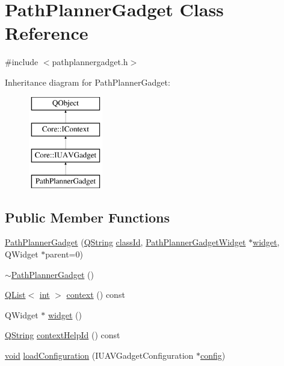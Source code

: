 \hypertarget{class_path_planner_gadget}{\section{Path\-Planner\-Gadget Class Reference}
\label{class_path_planner_gadget}
}


{\ttfamily \#include $<$pathplannergadget.\-h$>$}

Inheritance diagram for Path\-Planner\-Gadget\-:\begin{figure}[H]
\begin{center}
\leavevmode
\includegraphics[height=4.000000cm]{class_path_planner_gadget}
\end{center}
\end{figure}
\subsection*{Public Member Functions}
\begin{DoxyCompactItemize}
\item 
\hyperlink{group___path_planner_gadget_plugin_gac805c31521687b90ca55ae17a24e2cb0}{Path\-Planner\-Gadget} (\hyperlink{group___u_a_v_objects_plugin_gab9d252f49c333c94a72f97ce3105a32d}{Q\-String} \hyperlink{group___core_plugin_ga3878fde66a57220608960bcc3fbeef2c}{class\-Id}, \hyperlink{class_path_planner_gadget_widget}{Path\-Planner\-Gadget\-Widget} $\ast$\hyperlink{group___path_planner_gadget_plugin_ga4a83272b91f2a0359dfb4d3d950c6ae4}{widget}, Q\-Widget $\ast$parent=0)
\item 
\hyperlink{group___path_planner_gadget_plugin_ga6531735ac3658c46d3d3dd5ddd539f58}{$\sim$\-Path\-Planner\-Gadget} ()
\item 
\hyperlink{class_q_list}{Q\-List}$<$ \hyperlink{ioapi_8h_a787fa3cf048117ba7123753c1e74fcd6}{int} $>$ \hyperlink{group___path_planner_gadget_plugin_ga6c2bd0fcf98faa6389c96a15430723d7}{context} () const 
\item 
Q\-Widget $\ast$ \hyperlink{group___path_planner_gadget_plugin_ga4a83272b91f2a0359dfb4d3d950c6ae4}{widget} ()
\item 
\hyperlink{group___u_a_v_objects_plugin_gab9d252f49c333c94a72f97ce3105a32d}{Q\-String} \hyperlink{group___path_planner_gadget_plugin_ga214a421178941f98f54bd3588c1634bc}{context\-Help\-Id} () const 
\item 
\hyperlink{group___u_a_v_objects_plugin_ga444cf2ff3f0ecbe028adce838d373f5c}{void} \hyperlink{group___path_planner_gadget_plugin_ga7606029076dafbc5e187ffeea2cbfdac}{load\-Configuration} (I\-U\-A\-V\-Gadget\-Configuration $\ast$\hyperlink{deflate_8c_a4473b5227787415097004fd39f55185e}{config})
\end{DoxyCompactItemize}
